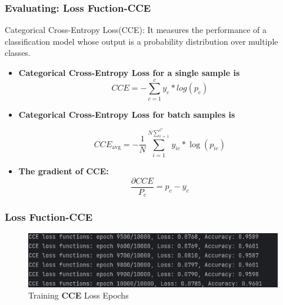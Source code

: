 \documentclass[aspectratio=1610]{beamer}
\begin{document}
\begin{frame}
    \frametitle{Evaluating: Loss Fuction-CCE}
    Categorical Cross-Entropy Loss(CCE): It measures the performance of a classification 
    model whose output is a probability distribution over multiple classes. 
    \vspace{0.5cm}

    \begin{itemize}

        \item  \textbf{Categorical Cross-Entropy Loss for a single sample is} 
        \[
            CCE = - \sum_{c=1}^{c} y_\text{c} * log(p_\text{c})
        \]

        \item \textbf{Categorical Cross-Entropy Loss for batch samples is }
        
\[
CCE_{\text{avg}} = - \frac{1}{N} \sum_{i=1}^{N\sum_{c=1}^{C}}  y_{ic} * \log(p_{ic})
\]
        
        \item \textbf{The gradient of CCE:}
       \[
       \frac{\partial CCE}{P_c} =  p_c - y_c
       \]
    \end{itemize}


\end{frame}

\begin{frame}
    \frametitle{ Loss Fuction-CCE}
   \begin{figure}
            \begin{center}
                \includegraphics[width=1\linewidth]{CCE.jpg}
                \caption{Training \textbf{CCE} Loss Epochs }
                \label{fig:modelE}
            \end{center}
        
    \end{figure}
\end{frame}
\end{document}
